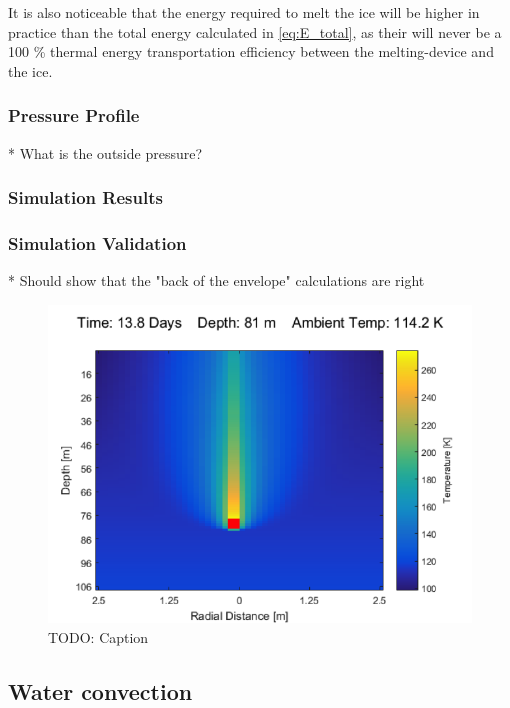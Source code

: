 It is also noticeable that the energy required to melt the ice will be higher in practice than the total energy calculated in \eqref{eq:E_total}, as their will never be a 100 \% thermal energy transportation efficiency between the melting-device and the ice.

\subsubsection{Pressure Profile}

* What is the outside pressure?

\subsubsection{Simulation Results}\label{sec:temp_simulation}

\subsubsection{Simulation Validation}

* Should show that the "back of the envelope" calculations are right

\begin{figure}[htb]
	\centering
	\includegraphics[width=\textwidth]{figures/temperature/temperature_simulation}
	\caption{TODO: Caption}
	\label{fig:temperature_simulation}
\end{figure}

\subsection{Water convection}

